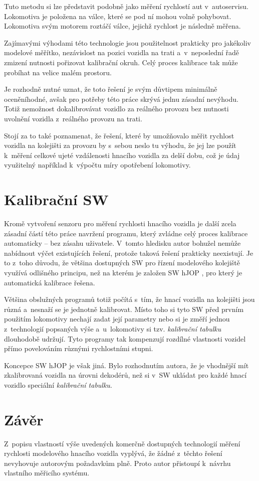 Tuto metodu si lze představit podobně jako měření rychlostí aut v~autoservisu.
Lokomotiva je položena na válce, které se pod ní mohou volně pohybovat.
Lokomotiva svým motorem roztáčí válce, jejichž rychlost je následně měřena.

Zajímavými výhodami této technologie jsou použitelnost prakticky pro jakékoliv
modelové měřítko, nezávislost na pozici vozidla na trati a~v~neposlední řadě
zmizení nutnosti pořizovat kalibrační okruh. Celý proces kalibrace tak může
probíhat na velice malém prostoru.

Je rozhodně nutné uznat, že toto řešení je svým důvtipem minimálně oceněníhodné,
avšak pro potřeby této práce skrývá jednu zásadní nevýhodu. Totiž nemožnost
dokalibrovávat vozidlo za reálného provozu bez nutnosti uvolnění vozidla
z~reálného provozu na trati.

Stojí za to také poznamenat, že řešení, které by umožňovalo měřit rychlost
vozidla na kolejišti za provozu by s~sebou neslo tu výhodu, že jej lze použít
k~měření celkové ujeté vzdálenosti hnacího vozidla za delší dobu, což je údaj
využitelný například k~výpočtu míry opotřebení lokomotivy.

\section{Kalibrační SW}
\label{sec:kalib-sw}

Kromě vytvoření senzoru pro měření rychlosti hnacího vozidla je další zcela
zásadní částí této práce navržení programu, který zvládne celý proces
kalibrace automaticky -- bez zásahu uživatele. V~tomto hledisku autor bohužel
nemůže nabídnout výčet existujících řešení, protože taková řešení
prakticky neexistují. Je to z~toho důvodu, že většina dostupných SW pro řízení
modelového kolejiště využívá odlišného principu, než na kterém je založen SW
hJOP \cite{hjop:web}, pro který je automatická kalibrace řešena.

Většina obslužných programů totiž počítá s~tím, že hnací vozidla na kolejišti
jsou různá a~nesnaží se je jednotně kalibrovat. Místo toho si tyto SW před
prvním použitím lokomotivy nechají zadat její parametry nebo si je změří jednou
z~technologií popsaných výše a~u~lokomotivy si tzv. \textit{kalibrační tabulku}
dlouhodobě udržují. Tyto programy tak kompenzují rozdílné vlastnosti vozidel přímo
povelováním různými rychlostními stupni.

Koncepce SW hJOP je však jiná. Bylo rozhodnutím autora, že je vhodnější mít
zkalibrovaná vozidla na úrovni dekodérů, než si v~SW ukládat pro každé hnací
vozidlo speciální \textit{kalibrační tabulku}.

\section{Závěr}
\label{sec:prehled-zaver}

Z~popisu vlastností výše uvedených komerčně dostupných technologií měření
rychlosti modelového hnacího vozidla vyplývá, že žádné z~těchto řešení
nevyhovuje autorovým požadavkům plně. Proto autor přistoupí k~návrhu vlastního
měřicího systému.
